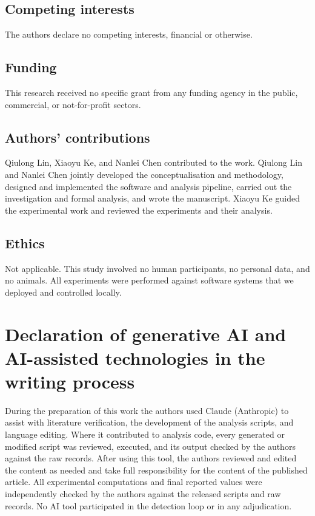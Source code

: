 \subsection*{Competing interests}

The authors declare no competing interests, financial or otherwise.

\subsection*{Funding}

This research received no specific grant from any funding agency in the public,
commercial, or not-for-profit sectors.

\subsection*{Authors' contributions}

Qiulong Lin, Xiaoyu Ke, and Nanlei Chen contributed to the work. Qiulong Lin
and Nanlei Chen jointly developed the conceptualisation and methodology,
designed and implemented the software and analysis pipeline, carried out the
investigation and formal analysis, and wrote the manuscript. Xiaoyu Ke guided
the experimental work and reviewed the experiments and their analysis.

\subsection*{Ethics}

Not applicable. This study involved no human participants, no personal data, and
no animals. All experiments were performed against software systems that we
deployed and controlled locally.

\section*{Declaration of generative AI and AI-assisted technologies in the writing process}

During the preparation of this work the authors used Claude (Anthropic) to assist
with literature verification, the development of the analysis scripts, and
language editing. Where it contributed to analysis code, every generated or
modified script was reviewed, executed, and its output checked by the authors
against the raw records. After using this tool, the authors reviewed and edited
the content as needed and take full responsibility for the content of the
published article. All experimental computations and final reported values were
independently checked by the authors against the released scripts and raw
records. No AI tool participated in the detection loop or in any adjudication.
